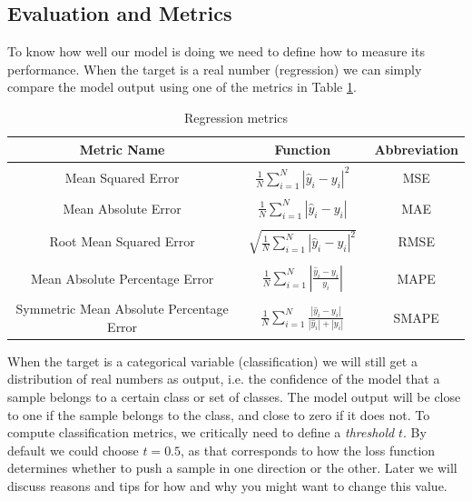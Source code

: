 \subsection{Evaluation and Metrics}
\label{evaluation}
To know how well our model is doing we need to define how to measure its performance.
When the target is a real number (regression) we can simply compare the model output using one of the metrics in Table \ref{table:regression_metrics}.
\begin{table}
    \centering
    \renewcommand{\arraystretch}{1.3}
    \begin{tabular}{|c| c| c|}
    Metric Name & Function & Abbreviation \\[0.5ex] \hline
    Mean Squared Error & $\begin{array} {lcl} \frac{1}{N} \sum_{i=1}^N|\hat{y}_i - y_i|^2\end{array}$ & MSE \\ [0.5ex]
    Mean Absolute Error & $\begin{array} {lcl} \frac{1}{N} \sum_{i=1}^N|\hat{y}_i - y_i|\end{array}$ & MAE \\ [0.5ex]
    Root Mean Squared Error & $\begin{array} {lcl} \sqrt{\frac{1}{N} \sum_{i=1}^N|\hat{y}_i - y_i|^2}\end{array}$ & RMSE\\ [0.5ex]
    Mean Absolute Percentage Error & $\begin{array} {lcl} \frac{1}{N} \sum_{i=1}^N \left| \frac{\hat{y}_i - y_i}{y_i}\right|\end{array}$ & MAPE\\ [0.5ex]
    Symmetric Mean Absolute Percentage Error & $\begin{array} {lcl} \frac{1}{N} \sum_{i=1}^N\frac{|\hat{y}_i - y_i|}{|\hat{y}_i| + |y_i|}\end{array}$  & SMAPE \\ [0.5ex]
    \end{tabular}
    \caption{Regression metrics}
    \label{table:regression_metrics}
\end{table}

When the target is a categorical variable (classification) we will still get a distribution of real numbers as output, i.e. the confidence of the model that a sample belongs to a certain class or set of classes.
The model output will be close to one if the sample belongs to the class, and close to zero if it does not.
To compute classification metrics, we critically need to define a \textit{threshold} $t$.
By default we could choose $t=0.5$, as that corresponds to how the loss function determines whether to push a sample in one direction or the other.
Later we will discuss reasons and tips for how and why you might want to change this value.

